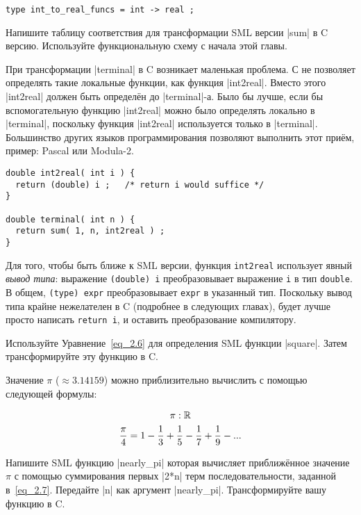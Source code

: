 \begin{lstlisting}[style=customml]
type int_to_real_funcs = int -> real ;
\end{lstlisting}

\exercise Напишите таблицу соответствия для трансформации SML версии \inline|sum| в C версию. Используйте функциональную схему с начала этой главы.\label{ex_2.9}

При трансформации \inline|terminal| в C возникает маленькая проблема. С не позволяет определять такие локальные функции, как функция \inline|int2real|. Вместо этого \inline|int2real| должен быть определён до \inline|terminal|-а. Было бы лучше, если бы вспомогательную функцию \inline|int2real| можно было определять локально в \inline|terminal|, поскольку функция \inline|int2real| используется только в \inline|terminal|. Большинство других языков программирования позволяют выполнить этот приём, пример: Pascal или Modula-2.

\begin{lstlisting}
double int2real( int i ) {
  return (double) i ;   /* return i would suffice */
}

double terminal( int n ) {
  return sum( 1, n, int2real ) ;
}
\end{lstlisting}

Для того, чтобы быть ближе к SML версии, функция \lstinline|int2real| использует явный \emph{вывод типа}: выражение \lstinline|(double) i| преобразовывает выражение \lstinline|i| в тип \lstinline|double|. В общем, \lstinline|(type) expr| преобразовывает \lstinline|expr| в указанный тип. Поскольку вывод типа крайне нежелателен в C (подробнее в следующих главах), будет лучше просто написать \lstinline|return i|, и оставить преобразование компилятору.

\exercise Используйте Уравнение~\ref{eq_2.6} для определения SML функции \inline|square|. Затем трансформируйте эту функцию в C.\label{ex_2.10}

\exercise Значение $\pi$ ($\approx 3.14159$) можно приблизительно вычислить с помощью следующей формулы:\label{ex_2.11}

\begin{gather}
  \pi : \mathbb R \notag \\
  \frac {\pi} {4} = 1 - \frac {1} {3} + \frac {1} {5} - \frac {1} {7} + \frac {1} {9} - ... \label{eq_2.7}
\end{gather}

Напишите SML функцию \inline|nearly_pi| которая вычисляет приближённое значение $\pi$ с помощью суммирования первых \inline|2*n| терм последовательности, заданной в~\ref{eq_2.7}. Передайте \inline|n| как аргумент \inline|nearly_pi|. Трансформируйте вашу функцию в C.

